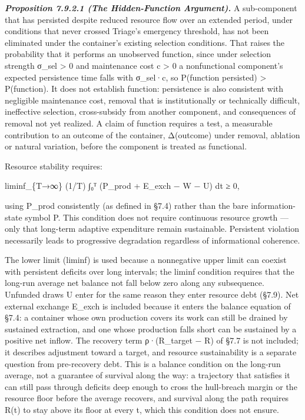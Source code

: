\documentclass[
]{article}
\begin{document}
\emph{\textbf{Proposition 7.9.2.1 (The Hidden-Function Argument).}} A
sub-component that has persisted despite reduced resource flow over an
extended period, under conditions that never crossed Triage's emergency
threshold, has not been eliminated under the container's existing
selection conditions. That raises the probability that it performs an
unobserved function, since under selection strength σ\_sel
\textgreater{} 0 and maintenance cost c \textgreater{} 0 a nonfunctional
component's expected persistence time falls with σ\_sel·c, so P(function
\textbar{} persisted) \textgreater{} P(function). It does not establish
function: persistence is also consistent with negligible maintenance
cost, removal that is institutionally or technically difficult,
ineffective selection, cross-subsidy from another component, and
consequences of removal not yet realized. A claim of function requires a
test, a measurable contribution to an outcome of the container,
Δ(outcome) under removal, ablation or natural variation, before the
component is treated as functional.

Resource stability requires:

liminf\_\{T→∞\} (1/T) ∫₀ᵀ (P\_prod + E\_exch − W − U) dt ≥ 0,

using P\_prod consistently (as defined in §7.4) rather than the bare
information-state symbol P. This condition does not require continuous
resource growth --- only that long-term adaptive expenditure remain
sustainable. Persistent violation necessarily leads to progressive
degradation regardless of informational coherence.

The lower limit (liminf) is used because a nonnegative upper limit can
coexist with persistent deficits over long intervals; the liminf
condition requires that the long-run average net balance not fall below
zero along any subsequence. Unfunded draws U enter for the same reason
they enter resource debt (§7.9). Net external exchange E\_exch is
included because it enters the balance equation of §7.4: a container
whose own production covers its work can still be drained by sustained
extraction, and one whose production falls short can be sustained by a
positive net inflow. The recovery term ρ·(R\_target − R) of §7.7 is not
included; it describes adjustment toward a target, and resource
sustainability is a separate question from pre-recovery debt. This is a
balance condition on the long-run average, not a guarantee of survival
along the way: a trajectory that satisfies it can still pass through
deficits deep enough to cross the hull-breach margin or the resource
floor before the average recovers, and survival along the path requires
R(t) to stay above its floor at every t, which this condition does not
ensure.
\end{document}
